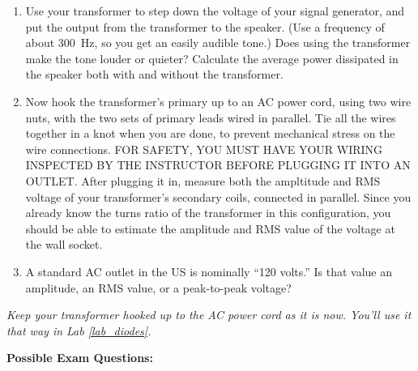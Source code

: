 \begin{enumerate}

\item Use your transformer to step down the voltage of your signal generator, and put the output from the transformer to the speaker.  (Use a frequency of about 300~Hz, so you get an easily audible tone.)  Does using the transformer make the tone louder or quieter?  Calculate the average power dissipated in the speaker both with and without the transformer.  

\item Now hook the transformer's primary up to an AC power cord, using two wire nuts, with the two sets of primary leads wired in parallel.  Tie all the wires together in a knot when you are done, to prevent mechanical stress on the wire connections.  FOR SAFETY, YOU MUST HAVE YOUR WIRING INSPECTED BY THE INSTRUCTOR BEFORE PLUGGING IT INTO AN OUTLET.  After plugging it in, measure both the ampltitude and RMS voltage of your transformer's secondary coils, connected in parallel.  Since you already know the turns ratio of the transformer in this configuration, you should be able to estimate the amplitude and RMS value of the voltage at the wall socket.  

\item A standard AC outlet in the US is nominally ``120 volts.''  Is that value an amplitude, an RMS value, or a peak-to-peak voltage? 

\end{enumerate}

\textit{Keep your transformer hooked up to the AC power cord as it is now.  You'll use it that way in Lab \ref{lab_diodes}.}

\bigskip

\textbf{Possible Exam Questions:}

